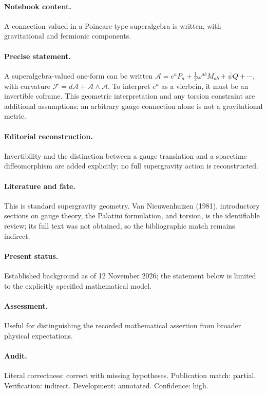 \paragraph{Notebook content.} A connection valued in a Poincare-type superalgebra is written, with gravitational and fermionic components.

\paragraph{Precise statement.} A superalgebra-valued one-form can be written \(\mathcal A=e^aP_a+\frac12\omega^{ab}M_{ab}+\overline\psi Q+\cdots\), with curvature \(\mathcal F=d\mathcal A+\mathcal A\wedge\mathcal A\). To interpret \(e^a\) as a vierbein, it must be an invertible coframe. This geometric interpretation and any torsion constraint are additional assumptions; an arbitrary gauge connection alone is not a gravitational metric.

\paragraph{Editorial reconstruction.} Invertibility and the distinction between a gauge translation and a spacetime diffeomorphism are added explicitly; no full supergravity action is reconstructed.

\paragraph{Literature and fate.} This is standard supergravity geometry. Van Nieuwenhuizen (1981), introductory sections on gauge theory, the Palatini formulation, and torsion, is the identifiable review; its full text was not obtained, so the bibliographic match remains indirect.

\paragraph{Present status.} Established background as of 12 November 2026; the statement below is limited to the explicitly specified mathematical model.

\paragraph{Assessment.} Useful for distinguishing the recorded mathematical assertion from broader physical expectations.

\paragraph{Audit.} Literal correctness: correct with missing hypotheses. Publication match: partial. Verification: indirect. Development: annotated. Confidence: high.

